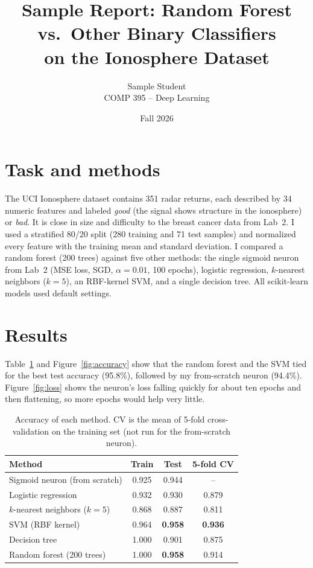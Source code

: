 \documentclass[11pt]{article}
\title{Sample Report: Random Forest vs.\ Other Binary Classifiers\\on the Ionosphere Dataset}
\author{Sample Student \\ COMP 395 -- Deep Learning}
\date{Fall 2026}
\begin{document}
\maketitle

\section*{Task and methods}

The UCI Ionosphere dataset contains 351 radar returns, each described by 34
numeric features and labeled \emph{good} (the signal shows structure in the
ionosphere) or \emph{bad}. It is close in size and difficulty to the breast
cancer data from Lab~2. I used a stratified 80/20 split (280 training and 71
test samples) and normalized every feature with the training mean and standard
deviation. I compared a random forest (200 trees) against five other methods:
the single sigmoid neuron from Lab~2 (MSE loss, SGD, $\alpha = 0.01$, 100
epochs), logistic regression, $k$-nearest neighbors ($k=5$), an RBF-kernel
SVM, and a single decision tree. All scikit-learn models used default settings.

\section*{Results}

Table~\ref{tab:results} and Figure~\ref{fig:accuracy} show that the random
forest and the SVM tied for the best test accuracy (95.8\%), followed by my
from-scratch neuron (94.4\%). Figure~\ref{fig:loss} shows the neuron's loss
falling quickly for about ten epochs and then flattening, so more epochs would
help very little.

\begin{table}[h]
  \centering
  \caption{Accuracy of each method. CV is the mean of 5-fold cross-validation
  on the training set (not run for the from-scratch neuron).}
  \label{tab:results}
  \begin{tabular}{lccc}
    \toprule
    Method & Train & Test & 5-fold CV \\
    \midrule
    Sigmoid neuron (from scratch) & 0.925 & 0.944 & --    \\
    Logistic regression           & 0.932 & 0.930 & 0.879 \\
    $k$-nearest neighbors ($k=5$) & 0.868 & 0.887 & 0.811 \\
    SVM (RBF kernel)              & 0.964 & \textbf{0.958} & \textbf{0.936} \\
    Decision tree                 & 1.000 & 0.901 & 0.875 \\
    Random forest (200 trees)     & 1.000 & \textbf{0.958} & 0.914 \\
    \bottomrule
  \end{tabular}
\end{table}
\end{document}
